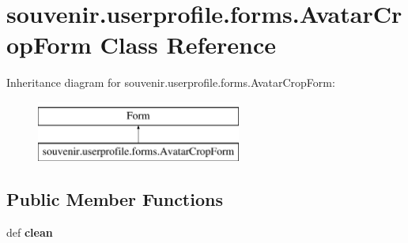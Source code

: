 \hypertarget{classsouvenir_1_1userprofile_1_1forms_1_1AvatarCropForm}{\section{souvenir.\-userprofile.\-forms.\-Avatar\-Crop\-Form Class Reference}
\label{classsouvenir_1_1userprofile_1_1forms_1_1AvatarCropForm}
}
Inheritance diagram for souvenir.\-userprofile.\-forms.\-Avatar\-Crop\-Form\-:\begin{figure}[H]
\begin{center}
\leavevmode
\includegraphics[height=2.000000cm]{classsouvenir_1_1userprofile_1_1forms_1_1AvatarCropForm}
\end{center}
\end{figure}
\subsection*{Public Member Functions}
\begin{DoxyCompactItemize}
\item 
\hypertarget{classsouvenir_1_1userprofile_1_1forms_1_1AvatarCropForm_a2111670436d9af115ed2b10c8053e925}{def {\bfseries clean}}\label{classsouvenir_1_1userprofile_1_1forms_1_1AvatarCropForm_a2111670436d9af115ed2b10c8053e925}

\end{DoxyCompactItemize}
